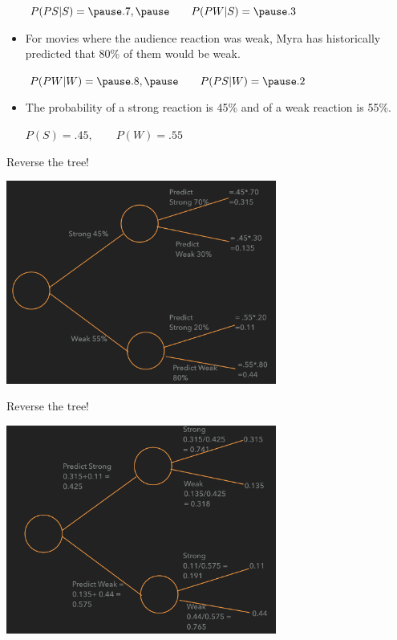 \documentclass{beamer}\usepackage[]{graphicx}\usepackage[]{color}
\begin{document}
\begin{darkframes}
\begin{frame}
\begin{itemize}
        $  P(PS|S) = \pause .7,\pause \qquad P(PW|S) = \pause .3 $ \pause
        \item For movies where the audience reaction was weak, Myra has historically predicted that 80\% of them would be weak.\pause

        $P(PW|W) = \pause .8,\pause \qquad P(PS|W) = \pause .2$  \pause
        \item The probability of a strong reaction is 45\% and of a weak reaction is 55\%.\pause
        
        $  P(S) = .45, \qquad P(W) = .55 $
      \end{itemize}
    \end{frame}



    \begin{frame}[fragile]{Reverse the tree!}

      \begin{center}
        \includegraphics[width=3.5in]{BeforeFlip} \\
      \end{center}

    \end{frame}


    \begin{frame}[fragile]{Reverse the tree!}

      \begin{center}
        \includegraphics[width=3.5in]{AfterFlip} \\
      \end{center}


\end{frame}
\end{darkframes}
\end{document}
